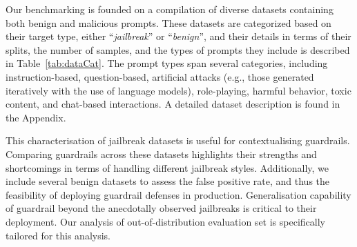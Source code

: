 

Our benchmarking is founded on a compilation of diverse datasets containing both benign and malicious prompts.
These datasets are categorized based on their target type, either ``\textit{jailbreak}'' or ``\textit{benign}'', and their details in terms of their splits, the number of samples, and the types of prompts they include is described in Table~\ref{tab:dataCat}.
The prompt types span several categories, including instruction-based, question-based, artificial attacks (e.g., those generated iteratively with the use of language models), role-playing, harmful behavior, toxic content, and chat-based interactions. A detailed dataset description is found in the Appendix.

This characterisation of jailbreak datasets is useful for contextualising guardrails.
Comparing guardrails across these datasets highlights their strengths and shortcomings in terms of handling different jailbreak styles.
Additionally, we include several benign datasets to assess the false positive rate, and thus the feasibility of deploying guardrail defenses in production.
Generalisation capability of guardrail beyond the anecdotally observed jailbreaks is critical to their deployment.
Our analysis of out-of-distribution evaluation set is specifically tailored for this analysis.




